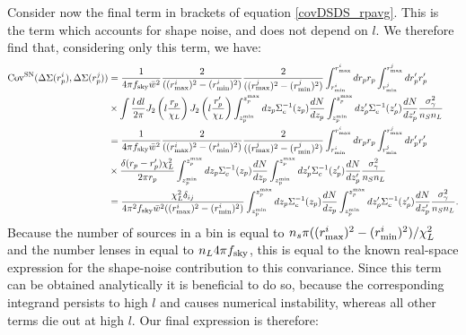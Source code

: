 \documentclass[onecolumn,amsmath,aps,fleqn, superscriptaddress]{revtex4}
\begin{document}
Consider now the final term in brackets of equation \ref{covDSDS_rpavg}. This is the term which accounts for shape noise, and does not depend on $l$. We therefore find that, considering only this term, we have:
\begin{align}
{\rm Cov}^{\rm SN}(\Delta \Sigma(r_p^i), \Delta \Sigma(r_p^j)) &= \frac{1}{4\pi f_{\rm sky}\bar{w}^2}\frac{2}{((r^i_{\rm max})^2 - (r^i_{\rm min})^2)}\frac{2}{((r^j_{\rm max})^2 - (r^j_{\rm min})^2)} \int_{r^i_{\rm min}}^{r^i_{\rm max}} dr_p r_p \int_{r^j_{\rm min}}^{r^j_{\rm max}} dr_p^\prime r_p^\prime \nonumber \\ &\times\int \frac{l \, dl}{2\pi} J_2\left(l \frac{r_p}{\chi_L}\right) J_2 \left(l \frac{r_p^\prime}{\chi_L}\right) \int_{z_p^{\rm min}}^{z_p^{\rm max}} d z_p \Sigma_c^{-1}(z_p)\frac{dN}{dz_p} \int_{z_p^{\rm min}}^{z_p^{\rm max}} dz_p^\prime \Sigma_c^{-1}(z_p^\prime) \frac{dN}{dz_p^\prime}\frac{\sigma_{\gamma}^2}{n_S n_L} \nonumber \\
&= \frac{1}{4\pi f_{\rm sky}\bar{w}^2}\frac{2}{((r^i_{\rm max})^2 - (r^i_{\rm min})^2)}\frac{2}{((r^j_{\rm max})^2 - (r^j_{\rm min})^2)} \int_{r^i_{\rm min}}^{r^i_{\rm max}} dr_p r_p \int_{r^j_{\rm min}}^{r^j_{\rm max}} dr_p^\prime r_p^\prime \nonumber \\ &\times \frac{\delta(r_p - r_p^\prime) \chi_L^2}{2 \pi r_p} \int_{z_p^{\rm min}}^{z_p^{\rm max}} d z_p \Sigma_c^{-1}(z_p)\frac{dN}{dz_p} \int_{z_p^{\rm min}}^{z_p^{\rm max}} dz_p^\prime \Sigma_c^{-1}(z_p^\prime) \frac{dN}{dz_p^\prime}\frac{\sigma_{\gamma}^2}{n_S n_L} \nonumber \\
&= \frac{\chi_L^2\delta_{ij}}{4\pi^2 f_{\rm sky}\bar{w}^2((r^i_{\rm max})^2 - (r^i_{\rm min})^2)} \int_{z_p^{\rm min}}^{z_p^{\rm max}} d z_p \Sigma_c^{-1}(z_p)\frac{dN}{dz_p} \int_{z_p^{\rm min}}^{z_p^{\rm max}} dz_p^\prime \Sigma_c^{-1}(z_p^\prime) \frac{dN}{dz_p^\prime}\frac{\sigma_{\gamma}^2}{n_S n_L}.
\label{covDSDS_rpavg_SN}
\end{align}
Because the number of sources in a bin is equal to $n_s \pi ((r^i_{\rm max})^2 - (r^i_{\rm min})^2) / \chi_L^2$ and the number lenses in equal to $n_L 4\pi f_{\rm sky}$, this is equal to the known real-space expression for the shape-noise contribution to this convariance. Since this term can be obtained analytically it is beneficial to do so, because the corresponding integrand persists to high $l$ and causes numerical instability, whereas all other terms die out at high $l$. Our final expression is therefore:
\end{document}
